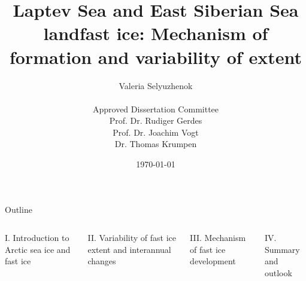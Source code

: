 \documentclass[8pt]{beamer}
\title{Laptev Sea and East Siberian Sea landfast ice: Mechanism of formation and variability of extent}
\date{\today}
\author{Valeria Selyuzhenok\\~\\\textsf {Approved Dissertation Committee}\\
	\textsf{Prof. Dr. Rudiger Gerdes}\\ 
	\textsf{Prof. Dr. Joachim Vogt}\\ 	
	\textsf{Dr. Thomas Krumpen}\\ }
\institute{Jacobs University Bremen}
\begin{document}
\maketitle

	
\setwatermark{\fontsize{125pt}{125pt}\selectfont{}}
\begin{frame}{Outline}
	\begin{columns}
		\begin{block}{I. Introduction to Arctic sea ice and fast ice}
		\end{block}
		\begin{block}{II. Variability of fast ice extent and interannual changes}
		\end{block}
		\begin{block}{III. Mechanism of fast ice development}
		\end{block}
		\begin{block}{IV. Summary and outlook} 
		\end{block}
	\end{columns}
\end{frame}
\end{document}
